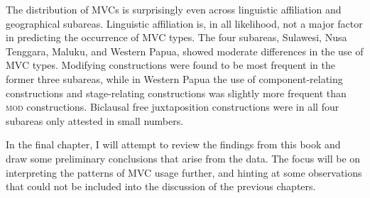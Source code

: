 The distribution of MVCs is surprisingly even across linguistic affiliation and geographical subareas. Linguistic affiliation is, in all likelihood, not a major factor in predicting the occurrence of MVC types. The four subareas, Sulawesi, Nusa Tenggara, Maluku, and Western Papua, showed moderate differences in the use of MVC types. Modifying constructions were found to be most frequent in the former three subareas, while in Western Papua the use of component-relating constructions and stage-relating constructions was slightly more frequent than \textsc{mod} constructions. Biclausal free juxtaposition constructions were in all four subareas only attested in small numbers. 

In the final chapter, I will attempt to review the findings from this book and draw some preliminary conclusions that arise from the data. The focus will be on interpreting the patterns of MVC usage further, and hinting at some observations that could not be included into the discussion of the previous chapters.